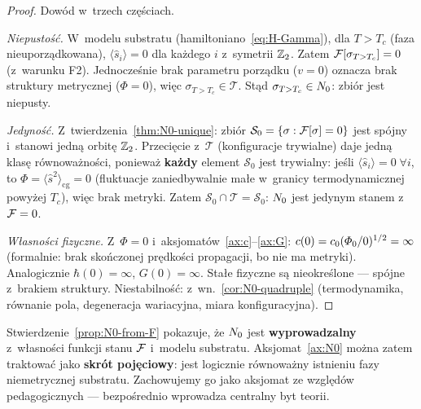 \begin{proof}
Dow\'od w~trzech cz\k{e}\'sciach.

\emph{Niepusto\'s\'c.}\;
W~modelu substratu (hamiltoniano~\ref{eq:H-Gamma}), dla $T > T_c$
(faza nieuporz\k{a}dkowana), $\langle\hat{s}_i\rangle = 0$ dla
ka\.zdego $i$ z~symetrii $\mathbb{Z}_2$. Zatem $\mathcal{F}[\sigma_{T>T_c}] = 0$
(z~warunku F2). Jednocze\'snie brak parametru porz\k{a}dku ($v = 0$)
oznacza brak struktury metrycznej ($\Phi = 0$), wi\k{e}c
$\sigma_{T>T_c} \in \mathcal{T}$. St\k{a}d
$\sigma_{T>T_c} \in N_0$: zbi\'or jest niepusty.

\emph{Jedyno\'s\'c.}\;
Z~twierdzenia~\ref{thm:N0-unique}: zbi\'or $\mathcal{S}_0
= \{\sigma : \mathcal{F}[\sigma] = 0\}$ jest sp\'ojny
i~stanowi jedn\k{a} orbit\k{e} $\mathbb{Z}_2$.
Przeci\k{e}cie z~$\mathcal{T}$ (konfiguracje trywialne)
daje jedn\k{a} klas\k{e} r\'ownowa\.zno\'sci, poniewa\.z
\textbf{ka\.zdy} element $\mathcal{S}_0$ jest trywialny:
je\'sli $\langle\hat{s}_i\rangle = 0\;\forall i$, to
$\Phi = \langle\hat{s}^2\rangle_{\mathrm{cg}} = 0$
(fluktuacje zaniedbywalnie ma\l{}e w~granicy termodynamicznej
powy\.zej $T_c$), wi\k{e}c brak metryki.
Zatem $\mathcal{S}_0 \cap \mathcal{T} = \mathcal{S}_0$:
$N_0$ jest jedynym stanem z~$\mathcal{F} = 0$.

\emph{W\l{}asno\'sci fizyczne.}\;
Z~$\Phi = 0$ i~aksjomat\'ow~\ref{ax:c}--\ref{ax:G}:
$c(0) = c_0(\varPhi_0/0)^{1/2} = \infty$
(formalnie: brak sko\'nczonej pr\k{e}dko\'sci propagacji,
bo nie ma metryki). Analogicznie $\hbar(0) = \infty$,
$G(0) = \infty$. Sta\l{}e fizyczne s\k{a} nieokre\'slone ---
sp\'ojne z~brakiem struktury.
Niestabilno\'s\'c: z~wn.~\ref{cor:N0-quadruple}
(termodynamika, r\'ownanie pola, degeneracja wariacyjna,
miara konfiguracyjna).
\end{proof}

\begin{remark}\label{rem:N0-aksjomat-vs-twierdzenie}
Stwierdzenie~\ref{prop:N0-from-F} pokazuje, \.ze $N_0$ jest
\textbf{wyprowadzalny} z~w\l{}asno\'sci funkcji stanu $\mathcal{F}$
i~modelu substratu. Aksjomat~\ref{ax:N0} mo\.zna zatem traktowa\'c
jako \textbf{skr\'ot poj\k{e}ciowy}: jest logicznie r\'ownowa\.zny
istnieniu fazy niemetrycznej substratu. Zachowujemy go jako aksjomat
ze wzgl\k{e}d\'ow pedagogicznych --- bezpo\'srednio wprowadza
centralny byt teorii.
\end{remark}


